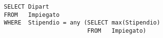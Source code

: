 \begin{lstlisting}
SELECT Dipart
FROM   Impiegato
WHERE  Stipendio = any (SELECT max(Stipendio)
                        FROM   Impiegato)
\end{lstlisting}
